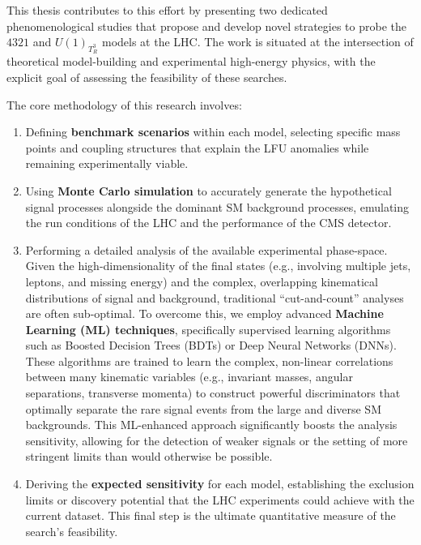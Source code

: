 This thesis contributes to this effort by presenting two dedicated phenomenological studies that propose and develop novel strategies to probe the $4321$ and $U(1)_{T^3_R}$ models at the LHC. The work is situated at the intersection of theoretical model-building and experimental high-energy physics, with the explicit goal of assessing the feasibility of these searches.

The core methodology of this research involves:
\begin{enumerate}
    \item Defining \textbf{benchmark scenarios} within each model, selecting specific mass points and coupling structures that explain the LFU anomalies while remaining experimentally viable.
    \item Using \textbf{Monte Carlo simulation} to accurately generate the hypothetical signal processes alongside the dominant SM background processes, emulating the run conditions of the LHC and the performance of the CMS detector.
    \item Performing a detailed analysis of the available experimental phase-space. Given the high-dimensionality of the final states (e.g., involving multiple jets, leptons, and missing energy) and the complex, overlapping kinematical distributions of signal and background, traditional ``cut-and-count'' analyses are often sub-optimal. To overcome this, we employ advanced \textbf{Machine Learning (ML) techniques}, specifically supervised learning algorithms such as Boosted Decision Trees (BDTs) or Deep Neural Networks (DNNs). These algorithms are trained to learn the complex, non-linear correlations between many kinematic variables (e.g., invariant masses, angular separations, transverse momenta) to construct powerful discriminators that optimally separate the rare signal events from the large and diverse SM backgrounds. This ML-enhanced approach significantly boosts the analysis sensitivity, allowing for the detection of weaker signals or the setting of more stringent limits than would otherwise be possible.
    \item Deriving the \textbf{expected sensitivity} for each model, establishing the exclusion limits or discovery potential that the LHC experiments could achieve with the current dataset. This final step is the ultimate quantitative measure of the search's feasibility.
\end{enumerate}

